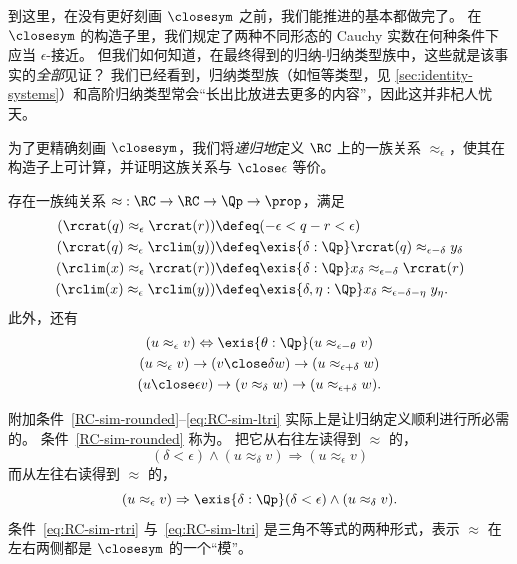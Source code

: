 到这里，在没有更好刻画 $\closesym$ 之前，我们能推进的基本都做完了。
在 $\closesym$ 的构造子里，我们规定了两种不同形态的 Cauchy 实数在何种条件下应当 $\epsilon$-接近。
但我们如何知道，在最终得到的归纳-归纳类型族中，这些就是该事实的\emph{全部}见证？
我们已经看到，归纳类型族（如恒等类型，见 \cref{sec:identity-systems}）和高阶归纳类型常会“长出比放进去更多的内容”，因此这并非杞人忧天。

为了更精确刻画 $\closesym$，我们将\emph{递归地}定义 $\RC$ 上的一族关系 $\approx_\epsilon$，使其在构造子上可计算，并证明这族关系与 $\close\epsilon$ 等价。

\begin{thm}\label{defn:RC-approx}
  存在一族纯关系 $\mathord\approx:\RC\to\RC\to\Qp\to\prop$，满足
  \begin{align}
    (\rcrat(q) \approx_\epsilon \rcrat(r))  &\defeq
    (-\epsilon < q - r < \epsilon)\label{eq:RCappx1}\\
    (\rcrat(q) \approx_\epsilon \rclim(y)) &\defeq
    \exis{\delta : \Qp} \rcrat(q) \approx_{\epsilon - \delta} y_\delta\label{eq:RCappx2}\\
    (\rclim(x) \approx_\epsilon \rcrat(r)) &\defeq
    \exis{\delta : \Qp} x_\delta \approx_{\epsilon - \delta} \rcrat(r)\label{eq:RCappx3}\\
    (\rclim(x) \approx_\epsilon \rclim(y)) &\defeq
    \exis{\delta, \eta : \Qp} x_\delta \approx_{\epsilon - \delta - \eta} y_\eta.\label{eq:RCappx4}
  \end{align}
  此外，还有
  \begin{gather}
    (u \approx_\epsilon v) \Leftrightarrow \exis{\theta:\Qp} (u \approx_{\epsilon-\theta} v) \label{RC-sim-rounded}\\
    (u \approx_\epsilon v) \to (v\close\delta w) \to (u\approx_{\epsilon+\delta} w)\label{eq:RC-sim-rtri}\\
    (u \close\epsilon v) \to (v\approx_\delta w) \to (u\approx_{\epsilon+\delta} w)\label{eq:RC-sim-ltri}.
  \end{gather}
\end{thm}

附加条件~\eqref{RC-sim-rounded}--\eqref{eq:RC-sim-ltri} 实际上是让归纳定义顺利进行所必需的。
条件~\eqref{RC-sim-rounded} 称为。
%
%
把它从右往左读得到 $\approx$ 的，
%
%
%
\begin{equation*}
  (\delta < \epsilon) \land (u \approx_\delta v) \Rightarrow (u \approx_\epsilon v)
\end{equation*}
%
而从左往右读得到 $\approx$ 的，
%
%
%
\begin{equation*}
  (u \approx_\epsilon v) \Rightarrow \exis{\delta : \Qp} (\delta < \epsilon) \land (u \approx_\delta v).
\end{equation*}
%
条件~\eqref{eq:RC-sim-rtri} 与~\eqref{eq:RC-sim-ltri} 是三角不等式的两种形式，表示 $\approx$ 在左右两侧都是 $\closesym$ 的一个“模”。

